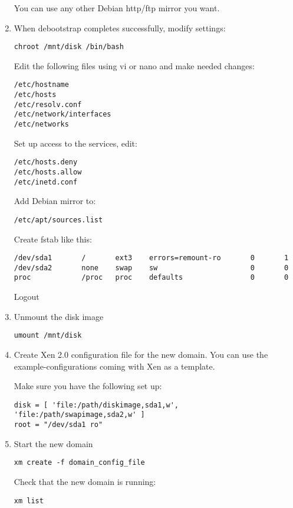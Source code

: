 \begin{enumerate}
  You can use any other Debian http/ftp mirror you want.

\item When debootstrap completes successfully, modify settings:
\begin{verbatim}
chroot /mnt/disk /bin/bash
\end{verbatim}

Edit the following files using vi or nano and make needed changes:
\begin{verbatim}
/etc/hostname
/etc/hosts
/etc/resolv.conf
/etc/network/interfaces
/etc/networks
\end{verbatim}

Set up access to the services, edit:
\begin{verbatim}
/etc/hosts.deny
/etc/hosts.allow
/etc/inetd.conf
\end{verbatim}

Add Debian mirror to:   
\begin{verbatim}
/etc/apt/sources.list
\end{verbatim}

Create fstab like this:
\begin{verbatim}
/dev/sda1       /       ext3    errors=remount-ro       0       1
/dev/sda2       none    swap    sw                      0       0
proc            /proc   proc    defaults                0       0
\end{verbatim}

Logout

\item Unmount the disk image
\begin{verbatim}
umount /mnt/disk
\end{verbatim}

\item Create Xen 2.0 configuration file for the new domain. You can
  use the example-configurations coming with Xen as a template.

  Make sure you have the following set up:
\begin{verbatim}
disk = [ 'file:/path/diskimage,sda1,w', 'file:/path/swapimage,sda2,w' ]
root = "/dev/sda1 ro"
\end{verbatim}

\item Start the new domain
\begin{verbatim}
xm create -f domain_config_file
\end{verbatim}

Check that the new domain is running:
\begin{verbatim}
xm list
\end{verbatim}


\end{enumerate}
